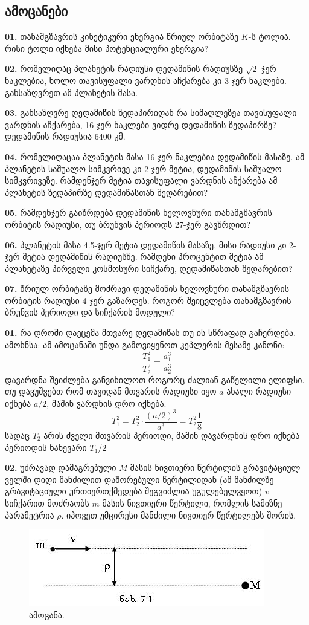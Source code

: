 \documentclass[a4paper]{book}
\begin{document}
\subsection{ამოცანები}
\qquad \textbf{01.} თანამგზავრის კინეტიკური ენერგია წრიულ ორბიტაზე $K$-ს ტოლია. რისი ტოლი იქნება მისი პოტენციალური ენერგია?

\textbf{02.} რომელიღაც პლანეტის რადიუსი დედამიწის რადიუსზე $\sqrt{2}$-ჯერ ნაკლებია, ხოლო თავისუფალი ვარდნის აჩქარება კი 3-ჯერ ნაკლები. განსაზღვრეთ ამ პლანეტის მასა.

\textbf{03.} განსაზღვრე დედამიწის ზედაპირიდან რა სიმაღლეზეა თავისუფალი ვარდნის აჩქარება, 16-ჯერ ნაკლები ვიდრე დედამიწის ზედაპირზე? დედამიწის რადიუსია 6400 კმ.

\textbf{04.} რომელიღაცაა პლანეტის მასა 16-ჯერ ნაკლებია დედამიწის მასაზე. ამ პლანეტის საშუალო სიმკვრივე კი 2-ჯერ მეტია, დედამიწის საშუალო სიმკვრივეზე. რამდენჯერ მეტია თავისუფალი ვარდნის აჩქარება ამ პლანეტის ზედაპირზე დედამიწასთან შედარებით?

\textbf{05.} რამდენჯერ გაიზრდება დედამიწის ხელოვნური თანამგზავრის ორბიტის რადიუსი, თუ ბრუნვის პერიოდს 27-ჯერ გავზრდით?

\textbf{06.} პლანეტის მასა 4.5-ჯერ მეტია დედამიწის მასაზე, მისი რადიუსი კი 2-ჯერ მეტია დედამიწის რადიუსზე. რამდენი პროცენტით მეტია ამ პლანეტაზე პირველი კოსმოსური სიჩქარე, დედამიწასთან შედარებით?

\textbf{07.} წრიულ ორბიტაზე მოძრავი დედამიწის ხელოვნური თანამგზავრის ორბიტის რადიუსი 4-ჯერ გაზარდეს. როგორ შეიცვლება თანამგზავრის ბრუნვის პერიოდი და სიჩქარის მოდული? 


\textbf{01.} რა დროში დაეცემა მთვარე დედამიწას თუ ის სწრაფად გაჩერდება.\\
ამოხნსა: ამ ამოცანაში უნდა გამოვიყენოთ კეპლერის მესამე კანონი:
	\begin{equation}
		\frac{T_1^2}{T_2^2} = \frac{a_1^3}{a_2^3}
	\end{equation}
დავარდნა შეიძლება განვიხილოთ როგორც ძალიან გაწელილი ელიფსი. თუ დავუშვებთ რომ თავიდან მთვარის რადიუსი იყო $a$ ახალი რადიუსი იქნება $a/2$, მაშინ ვარდნის დრო იქნება.
	\begin{equation}
		T_1^2 = T_2^2\cdot\frac{(a/2)^3}{a^3} = T_2^2 \frac{1}{8}
	\end{equation}
სადაც $T_2$ არის ძველი მთვარის პერიოდი, მაშინ დავარდნის დრო იქნება პერიოდის ნახევარი $T_1/2$

\textbf{02.} უძრავად დამაგრებული $M$ მასის ნივთიერი წერტილის გრავიტაციულ ველში დიდი მანძილით დაშორებული წერტილიდან (ამ მანძილზე გრავიტაციული ურთიერთქმედება შეგვიძლია უგულებელვყოთ) $v$ სიჩქარით მოძრაობს $m$ მასის ნივთიერი წერტილი, რომლის სამიზნე პარამეტრია $\rho$. იპოვეთ უმცირესი მანძილი ნივთიერ წერტილებს შორის.
		\begin{figure}[h]
		   \centering
           \includegraphics[width=0.5\columnwidth]{figures/fig_1}
           \caption{ამოცანა.}
        \end{figure}
        
\end{document}

